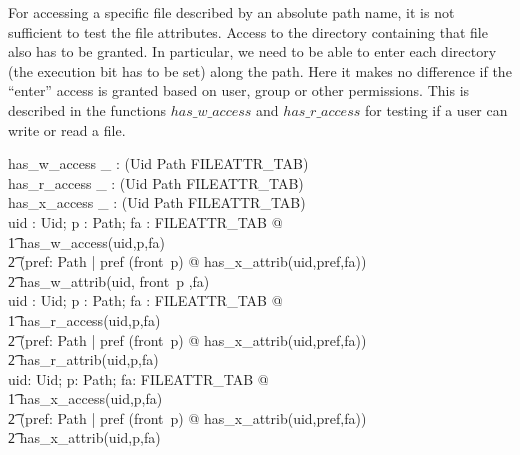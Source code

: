 For accessing a specific file described by an absolute path name, it is not
sufficient to test the file attributes.  Access to the directory containing that
file also has to be granted. In particular, we need to be able to enter each
directory (the execution bit has to be set) along the path. Here it makes no
difference if the ``enter'' access is granted based on user, group or other
permissions.  This is described in the functions $has\_w\_access$ and
$has\_r\_access$ for testing if a user can write or read a file.
\begin{doc}{3}
  \begin{axdef}
    has\_w\_access \_ : \power (Uid \cross Path \cross FILEATTR\_TAB) \\
    has\_r\_access \_ : \power (Uid \cross Path \cross FILEATTR\_TAB) \\
    has\_x\_access \_ : \power (Uid \cross Path \cross FILEATTR\_TAB) \\
    \where
    \forall uid : Uid; p : Path; fa : FILEATTR\_TAB @ \\
    \t1 has\_w\_access(uid,p,fa) \iff \\
    \t2 (\forall pref: Path | pref \prefix(front~p) @ has\_x\_attrib(uid,pref,fa)) \\
    \t2 \land has\_w\_attrib(uid, front~p ,fa) \\
    
    \forall uid : Uid; p : Path; fa : FILEATTR\_TAB @ \\
    \t1 has\_r\_access(uid,p,fa) \iff \\
    \t2 (\forall pref: Path | pref \prefix(front~p) @ has\_x\_attrib(uid,pref,fa)) \\
    \t2 \land has\_r\_attrib(uid,p,fa) \\

    \forall uid: Uid; p: Path; fa: FILEATTR\_TAB @ \\
    \t1 has\_x\_access(uid,p,fa) \iff \\
    \t2 (\forall pref: Path | pref \prefix(front~p) @ has\_x\_attrib(uid,pref,fa)) \\
    \t2 \land has\_x\_attrib(uid,p,fa) \\
  \end{axdef}
\end{doc}


